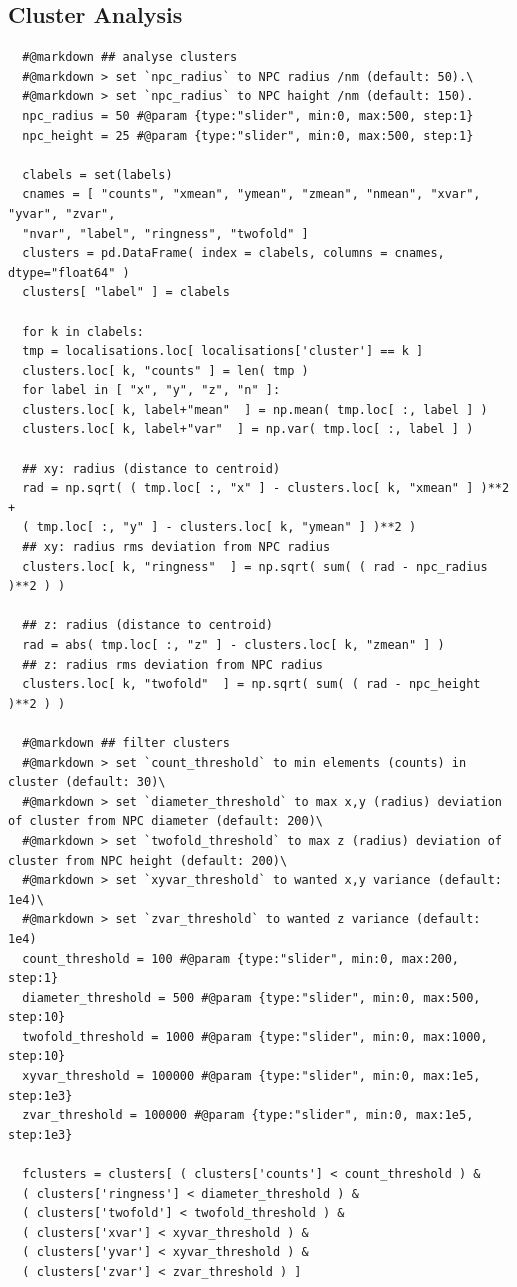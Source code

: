 \documentclass[11pt, a4paper, oneside, twocolumn]{report}
\begin{document}
\subsection{Cluster Analysis}

\begin{verbatim}
  #@markdown ## analyse clusters
  #@markdown > set `npc_radius` to NPC radius /nm (default: 50).\
  #@markdown > set `npc_radius` to NPC haight /nm (default: 150).
  npc_radius = 50 #@param {type:"slider", min:0, max:500, step:1}
  npc_height = 25 #@param {type:"slider", min:0, max:500, step:1}

  clabels = set(labels)
  cnames = [ "counts", "xmean", "ymean", "zmean", "nmean", "xvar", "yvar", "zvar",
  "nvar", "label", "ringness", "twofold" ]
  clusters = pd.DataFrame( index = clabels, columns = cnames, dtype="float64" )
  clusters[ "label" ] = clabels

  for k in clabels:
  tmp = localisations.loc[ localisations['cluster'] == k ]
  clusters.loc[ k, "counts" ] = len( tmp )
  for label in [ "x", "y", "z", "n" ]:
  clusters.loc[ k, label+"mean"  ] = np.mean( tmp.loc[ :, label ] )
  clusters.loc[ k, label+"var"  ] = np.var( tmp.loc[ :, label ] )

  ## xy: radius (distance to centroid)
  rad = np.sqrt( ( tmp.loc[ :, "x" ] - clusters.loc[ k, "xmean" ] )**2 + 
  ( tmp.loc[ :, "y" ] - clusters.loc[ k, "ymean" ] )**2 )
  ## xy: radius rms deviation from NPC radius
  clusters.loc[ k, "ringness"  ] = np.sqrt( sum( ( rad - npc_radius )**2 ) )

  ## z: radius (distance to centroid)
  rad = abs( tmp.loc[ :, "z" ] - clusters.loc[ k, "zmean" ] )
  ## z: radius rms deviation from NPC radius
  clusters.loc[ k, "twofold"  ] = np.sqrt( sum( ( rad - npc_height )**2 ) )

  #@markdown ## filter clusters
  #@markdown > set `count_threshold` to min elements (counts) in cluster (default: 30)\
  #@markdown > set `diameter_threshold` to max x,y (radius) deviation of cluster from NPC diameter (default: 200)\
  #@markdown > set `twofold_threshold` to max z (radius) deviation of cluster from NPC height (default: 200)\
  #@markdown > set `xyvar_threshold` to wanted x,y variance (default: 1e4)\
  #@markdown > set `zvar_threshold` to wanted z variance (default: 1e4)
  count_threshold = 100 #@param {type:"slider", min:0, max:200, step:1}
  diameter_threshold = 500 #@param {type:"slider", min:0, max:500, step:10}
  twofold_threshold = 1000 #@param {type:"slider", min:0, max:1000, step:10}
  xyvar_threshold = 100000 #@param {type:"slider", min:0, max:1e5, step:1e3}
  zvar_threshold = 100000 #@param {type:"slider", min:0, max:1e5, step:1e3}

  fclusters = clusters[ ( clusters['counts'] < count_threshold ) &
  ( clusters['ringness'] < diameter_threshold ) &
  ( clusters['twofold'] < twofold_threshold ) &
  ( clusters['xvar'] < xyvar_threshold ) & 
  ( clusters['yvar'] < xyvar_threshold ) &
  ( clusters['zvar'] < zvar_threshold ) ]
\end{verbatim}
\end{document}
